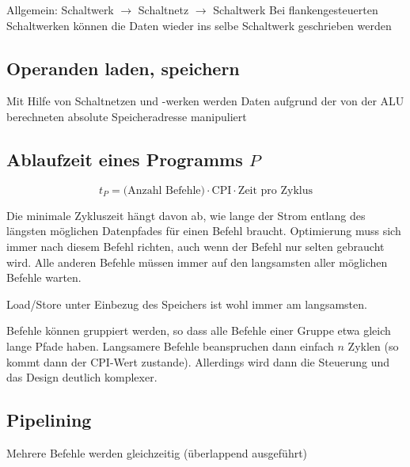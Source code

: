 Allgemein: Schaltwerk $\rightarrow$ Schaltnetz $\rightarrow$ Schaltwerk
Bei flankengesteuerten Schaltwerken können die Daten wieder ins selbe Schaltwerk geschrieben werden

\subsection{Operanden laden, speichern}
Mit Hilfe von Schaltnetzen und -werken werden Daten aufgrund der von der ALU berechneten  absolute Speicheradresse manipuliert

\subsection{Ablaufzeit eines Programms $P$}
\begin{equation*}
	t_P = \mbox{(Anzahl Befehle)} \cdot \mbox{CPI} \cdot \mbox{Zeit pro Zyklus}
\end{equation*}

Die minimale Zykluszeit hängt davon ab, wie lange der Strom entlang des längsten möglichen Datenpfades für einen Befehl braucht. Optimierung muss sich immer nach diesem Befehl richten,
auch wenn der Befehl nur selten gebraucht wird. Alle anderen Befehle müssen immer auf den langsamsten aller möglichen Befehle warten.

Load/Store unter Einbezug des Speichers ist wohl immer am langsamsten.

Befehle können gruppiert werden, so dass alle Befehle einer Gruppe etwa gleich lange Pfade haben. Langsamere Befehle beanspruchen dann einfach $n$ Zyklen (so kommt dann der CPI-Wert zustande). Allerdings wird dann die Steuerung und das Design deutlich komplexer.

\subsection{Pipelining}
Mehrere Befehle werden gleichzeitig (überlappend ausgeführt)


